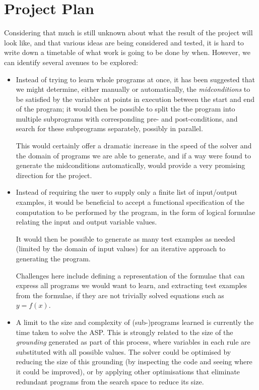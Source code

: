 \documentclass[a4paper,twoside,notitlepage]{article}
\begin{document}
\section{Project Plan} \label{sec:projplan}

Considering that much is still unknown about what the result of the project 
will look like, and that various ideas are being considered and tested, it is 
hard to write down a timetable of what work is going to be done by when. 
However, we can identify several avenues to be explored:
\begin{itemize}

    \item Instead of trying to learn whole programs at once, it has been 
    suggested that we might determine, either manually or automatically, the 
    \emph{midconditions} to be satisfied by the variables at points in 
    execution between the start and end of the program; it would then be 
    possible to split the the program into multiple subprograms with 
    corresponding pre- and post-conditions, and search for these subprograms 
    separately, possibly in parallel.
    
    This would certainly offer a dramatic increase in the speed of the solver 
    and the domain of programs we are able to generate, and if a way were 
    found to generate the midconditions automatically, would provide a very 
    promising direction for the project.

    \item Instead of requiring the user to supply only a finite list of 
    input/output examples, it would be beneficial to accept a functional 
    specification of the computation to be performed by the program, in the 
    form of logical formulae relating the input and output variable values.
    
    It would then be possible to generate as many test examples as needed 
    (limited by the domain of input values) for an iterative approach to 
    generating the program.
    
    Challenges here include defining a representation of the formulae that can 
    express all programs we would want to learn, and extracting test examples 
    from the formulae, if they are not trivially solved equations such as $y = 
    f(x)$.

    \item A limit to the size and complexity of (sub-)programs learned is 
    currently the time taken to solve the ASP. This is strongly related to the 
    size of the \emph{grounding} generated as part of this process, where 
    variables in each rule are substituted with all possible values. The 
    solver could be optimised by reducing the size of this grounding (by 
    inspecting the code and seeing where it could be improved), or by applying 
    other optimisations that eliminate redundant programs from the search 
    space to reduce its size.

\end{itemize}
\end{document}
